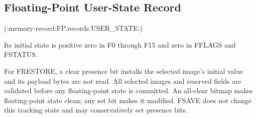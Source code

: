 \subsection{Floating-Point User-State Record}

(:memory-record:FP.records.USER_STATE:)

Its initial state is positive zero in F0 through F15 and zero in FFLAGS and FSTATUS.

For FRESTORE, a clear presence bit installs the selected image's initial value and its payload bytes are not read. All selected images and reserved fields are validated before any floating-point state is committed. An all-clear bitmap makes floating-point state clean; any set bit makes it modified. FSAVE does not change this tracking state and may conservatively set presence bits.
